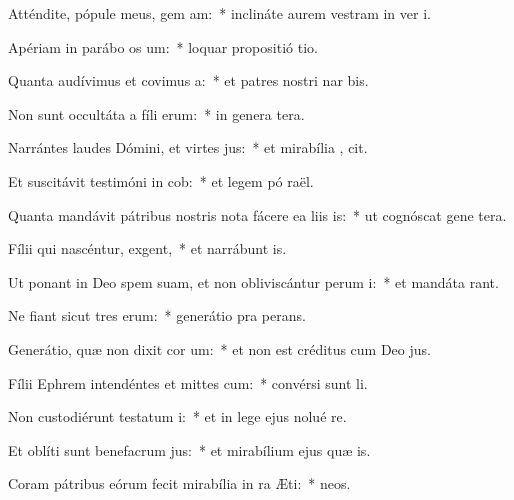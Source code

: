 \item Atténdite, pópule meus, gem am:~* inclináte aurem vestram in ver  i.
\item Apériam in parábo os um:~* loquar propositió  tio.
\item Quanta audívimus et covimus a:~* et patres nostri nar bis.
\item Non sunt occultáta a fíli erum:~* in genera tera.
\item Narrántes laudes Dómini, et virtes jus:~* et mirabília ,  cit.
\item Et suscitávit testimóni in cob:~* et legem pó  raël.
\item Quanta mandávit pátribus nostris nota fácere ea liis is:~* ut cognóscat gene tera.
\item Fílii qui nascéntur,  exgent,~* et narrábunt  is.
\item Ut ponant in Deo spem suam, et non obliviscántur perum i:~* et mandáta  rant.
\item Ne fiant sicut tres erum:~* generátio pra  perans.
\item Generátio, quæ non dixit cor um:~* et non est créditus cum Deo  jus.
\item Fílii Ephrem intendéntes et mittes cum:~* convérsi sunt   li.
\item Non custodiérunt testatum i:~* et in lege ejus nolué re.
\item Et oblíti sunt benefacrum jus:~* et mirabílium ejus quæ  is.
\item Coram pátribus eórum fecit mirabília in ra Æti:~*   neos.

